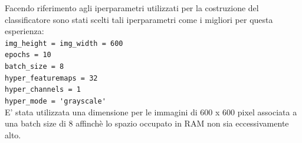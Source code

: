 Facendo riferimento agli iperparametri utilizzati per la costruzione del classificatore sono stati
 scelti tali iperparametri come i migliori per questa esperienza:\\
\lstinline{img_height = img_width = 600}\\
\lstinline{epochs = 10}\\
\lstinline{batch_size = 8}\\
\lstinline{hyper_featuremaps = 32}\\
\lstinline{hyper_channels = 1}\\
\lstinline{hyper_mode = 'grayscale'}\\

E’ stata utilizzata una dimensione per le immagini di 600 x 600 pixel associata a una batch size di 8
 affinchè lo spazio occupato in RAM non sia eccessivamente alto.  \\


